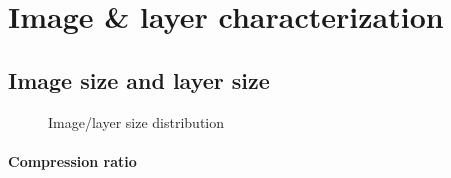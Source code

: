 \section{Image \& layer characterization}
\label{sec:redundant_layers}

\subsection{Image size and layer size}

\begin{figure}[!t]
	\centering
	\caption{Image/layer size distribution}
	\label{fig:image-layer-size}
\end{figure}

\paragraph{Compression ratio}

